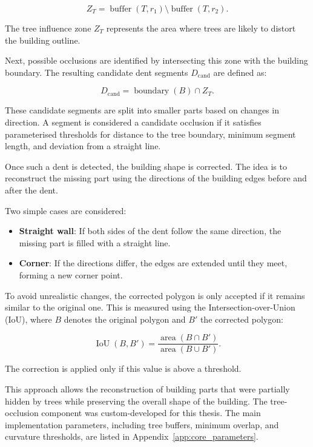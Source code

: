 \begin{equation}
Z_T = \operatorname{buffer}(T, r_1) \setminus \operatorname{buffer}(T, r_2).
\end{equation}

The tree influence zone \(Z_T\) represents the area where trees are likely to distort the building outline.

Next, possible occlusions are identified by intersecting this zone with the building boundary. The resulting candidate dent segments \(D_{\mathrm{cand}}\) are defined as:

\begin{equation}
D_{\mathrm{cand}} = \operatorname{boundary}(B) \cap Z_T.
\end{equation}

These candidate segments are split into smaller parts based on changes in direction. A segment is considered a candidate occlusion if it satisfies parameterised thresholds for distance to the tree boundary, minimum segment length, and deviation from a straight line.

Once such a dent is detected, the building shape is corrected. The idea is to reconstruct the missing part using the directions of the building edges before and after the dent.

Two simple cases are considered:

\begin{itemize}
    \item \textbf{Straight wall}: If both sides of the dent follow the same direction, the missing part is filled with a straight line.
    
    \item \textbf{Corner}: If the directions differ, the edges are extended until they meet, forming a new corner point.
\end{itemize}

To avoid unrealistic changes, the corrected polygon is only accepted if it remains similar to the original one. This is measured using the Intersection-over-Union (IoU), where \(B\) denotes the original polygon and \(B'\) the corrected polygon:

\begin{equation}
\operatorname{IoU}(B, B') =
\frac{\operatorname{area}(B \cap B')}{\operatorname{area}(B \cup B')}.
\end{equation}

The correction is applied only if this value is above a threshold.

This approach allows the reconstruction of building parts that were partially hidden by trees while preserving the overall shape of the building. The tree-occlusion component was custom-developed for this thesis. The main implementation parameters, including tree buffers, minimum overlap, and curvature thresholds, are listed in Appendix~\ref{app:core_parameters}.


